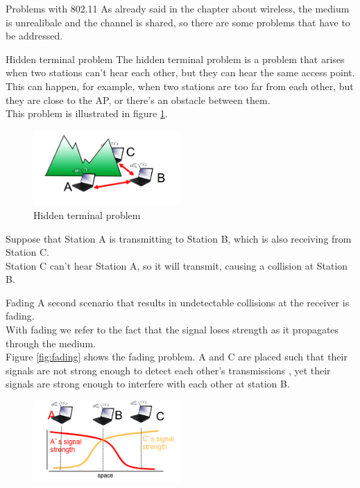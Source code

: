 \begin{section}{Problems with 802.11}
  As already said in the chapter about wireless, the medium is unrealibale and the channel is shared, so
  there are some problems that have to be addressed.
  \begin{subsection}{Hidden terminal problem}
    The hidden terminal problem is a problem that arises when two stations can't hear each other, but they
    can hear the same access point.\\
    This can happen, for example, when two stations are too far from each other, but they are close 
    to the AP, or there's an obstacle between them.\\
    This problem is illustrated in figure \ref{fig:hidden terminal problem}.
    \begin{figure}[h]
      \centering
      \includegraphics[width=0.5\textwidth]{img/wireless/hidden terminal problem.png}
      \caption{Hidden terminal problem}
      \label{fig:hidden terminal problem}
    \end{figure}
    Suppose that Station A is transmitting to Station B, which is also receiving from Station C.\\
    Station C can't hear Station A, so it will transmit, causing a collision at Station B.
  \end{subsection}
  \begin{subsection}{Fading}
    A second scenario that results in undetectable collisions at the receiver is fading.\\
    With fading we refer to the fact that the signal loses strength as it propagates through the medium.\\
    Figure \ref{fig:fading} shows the fading problem. A and C are placed such that their signals 
    are not strong enough to detect each other's transmissions , yet their signals are strong 
    enough to interfere with each other at station B.
    \begin{figure}[h]
      \centering
      \includegraphics[width=0.5\textwidth]{img/wireless/fading.png}

\end{figure}
\end{subsection}
\end{section}
